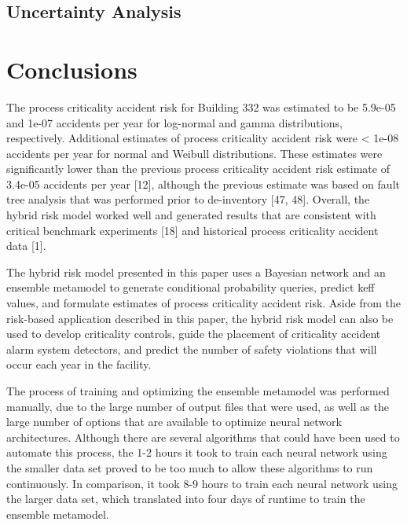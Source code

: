 \section{Uncertainty Analysis}


\chapter{Conclusions}

The process criticality accident risk for Building 332 was estimated to be 5.9e-05 and 1e-07 accidents per year for log-normal and gamma distributions, respectively.
Additional estimates of process criticality accident risk were < 1e-08 accidents per year for normal and Weibull distributions.
These estimates were significantly lower than the previous process criticality accident risk estimate of 3.4e-05 accidents per year [12], although the previous estimate was based on fault tree analysis that was performed prior to de-inventory [47, 48]. 
Overall, the hybrid risk model worked well and generated results that are consistent with critical benchmark experiments [18] and historical process criticality accident data [1]. 

The hybrid risk model presented in this paper uses a Bayesian network and an ensemble metamodel to generate conditional probability queries, predict keff values, and formulate estimates of process criticality accident risk.
Aside from the risk-based application described in this paper, the hybrid risk model can also be used to develop criticality controls, guide the placement of criticality accident alarm system detectors, and predict the number of safety violations that will occur each year in the facility.

The process of training and optimizing the ensemble metamodel was performed manually, due to the large number of output files that were used, as well as the large number of options that are available to optimize neural network architectures.
Although there are several algorithms that could have been used to automate this process, the 1-2 hours it took to train each neural network using the smaller data set proved to be too much to allow these algorithms to run continuously.
In comparison, it took 8-9 hours to train each neural network using the larger data set, which translated into four days of runtime to train the ensemble metamodel.

